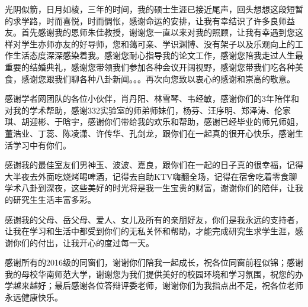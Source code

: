 ﻿\begin{ack}
光阴似箭，日月如棱，三年的时间，我的硕士生涯已接近尾声，回头想想这段短暂的求学路，时而喜悦，时而惆怅，感谢命运的安排，让我有幸结识了许多良师益友。首先感谢我的恩师朱佳教授，谢谢您一直以来对我的照顾，让我有幸遇到您这样对学生亦师亦友的好导师，您和蔼可亲、学识渊博、没有架子以及乐观向上的工作生活态度深深感染着我。感谢您耐心指导我的论文工作，感谢您陪我走过人生最重要的结婚典礼，感谢您带领我们参加各种会议开阔视野，感谢您带我们吃各种美食，感谢您跟我们聊各种八卦新闻。。。再次向您致以衷心的感谢和崇高的敬意。

感谢学者网团队的各位小伙伴，肖丹阳、林雪琴、韦经敏，感谢你们的3年陪伴和对我的学术帮助，感谢332实验室的师弟师妹们，杨芬、汪序明、郑泽涛、伦家琪、胡迎彬、于晗宇，感谢你们带给我的欢乐和帮助，感谢已经毕业的师兄师姐，董浩业、丁蕊、陈凌潇、许传华、孔剑龙，跟你们在一起真的很开心快乐，感谢生活学习中有你们。

感谢我的最佳室友们男神玉、波波、嘉良，跟你们在一起的日子真的很幸福，记得大半夜去外面吃烧烤喝啤酒，记得去自助KTV嗨翻全场，记得在宿舍吃着零食聊学术八卦到深夜，这些美好的时光将是我一生宝贵的财富，谢谢你们的陪伴，让我的研究生生活丰富多彩。

感谢我的父母、岳父母、爱人、女儿及所有的亲朋好友，你们是我永远的支持者，让我在学习和生活中都受到你们的无私关怀和帮助，才能完成研究生求学生涯，感谢你们的付出，让我开心的度过每一天。

感谢所有的2016级的同窗们，谢谢你们陪我一起成长，祝各位同窗前程似锦；感谢我的母校华南师范大学，谢谢您为我们提供美好的校园环境和学习氛围，祝您的办学越来越好；最后感谢各位答辩评委老师，谢谢你们为我指点出不足，祝各位老师永远健康快乐。

\end{ack}

